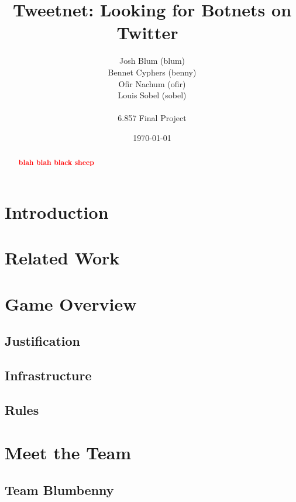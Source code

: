 \documentclass[11pt, oneside]{article} %
\title{ 
Tweetnet: Looking for Botnets on Twitter\
}
\author{
Josh Blum (blum)\\
Bennet Cyphers (benny)\\
Ofir Nachum (ofir)\\
Louis Sobel (sobel)\\
\\
6.857 Final Project
\date{\today}
}
\numberwithin{equation}{section} %
\numberwithin{figure}{section} %
\numberwithin{table}{section} %
\newcommand\todo[1]{\textbf{\textcolor{red}{#1}}}
\begin{document}
\maketitle

\vfill

\begin{abstract}
\todo{blah blah black sheep}
\end{abstract}

\clearpage

\section {Introduction}

\section {Related Work}

\section{Game Overview}
	\subsection{Justification}
	\subsection{Infrastructure}
	\subsection{Rules}

\section{Meet the Team}
	\subsection{Team Blumbenny}
\end{document}
